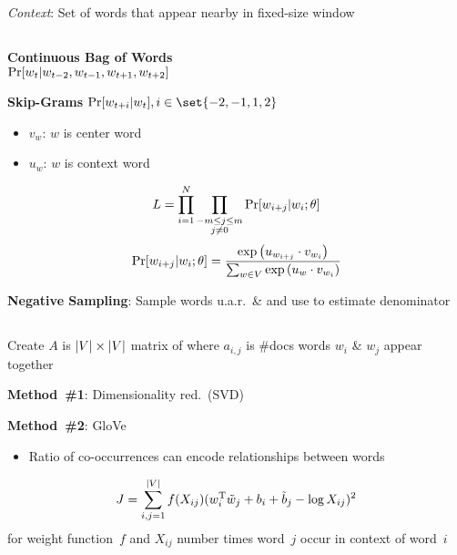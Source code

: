 \documentclass[9pt]{extarticle}
\renewcommand{\green}[1]{{\color{ForestGreen} #1}}
\newcommand{\greenbf}[1]{\textbf{\green{#1}}}
\begin{document}
\begin{multicols}{3}
  \textit{Context}: Set of words that appear nearby in fixed-size window

  \subsection*{}

  \greenbf{Continuous Bag of Words} \\ ${\Pr\lbrack w_t \vert w_{t-2}, w_{t-1}, w_{t+1}, w_{t+2}\rbrack}$

  \greenbf{Skip-Grams} ${\Pr\sbrack{w_{t+i} \vert w_{t}}, i \in \set{-2,-1,1,2}}$
  \begin{itemize}
    \item $v_w$: $w$ is center word
    \item $u_w$: $w$ is context word
  \end{itemize}
  \begin{equation*}
    L = \prod_{i=1}^{N} \prod_{\substack{-m \leq j \leq m \\ j \ne 0}} \Pr\lbrack w_{i+j} \vert w_{i} ; \theta\rbrack
  \end{equation*}
  \begin{equation*}
    \Pr\lbrack w_{i+j} \vert w_{i} ; \theta\rbrack = \frac{\exp\left(u_{w_{i+j}} \cdot v_{w_i} \right)}{\sum_{w \in V} \exp\left(u_{w} \cdot v_{w_i} \right)}
  \end{equation*}

  \greenbf{Negative Sampling}: Sample words u.a.r.\ \& and use to estimate denominator

  \subsection*{}

  Create $A$ is ${\lvert V\rvert \times \lvert V\rvert}$ matrix of where $a_{i,j}$ is \#docs words $w_i$ \& $w_j$ appear together

  \greenbf{Method~\#1}: Dimensionality red.\ (SVD)

  \greenbf{Method~\#2}: GloVe
  \begin{itemize}
    \item Ratio of co-occurrences can encode relationships between words
  \end{itemize}
  \begin{equation*}
    J = \sum_{i,j=1}^{\lvert V\rvert} f(X_{ij})(w_{i}^{\text{T}}\tilde{w}_j + b_i + \tilde{b}_j - \log X_{ij})^{2}
  \end{equation*}
  for weight function~$f$ and $X_{ij}$ number times word~$j$ occur in context of word~$i$

\end{multicols}
\end{document}
